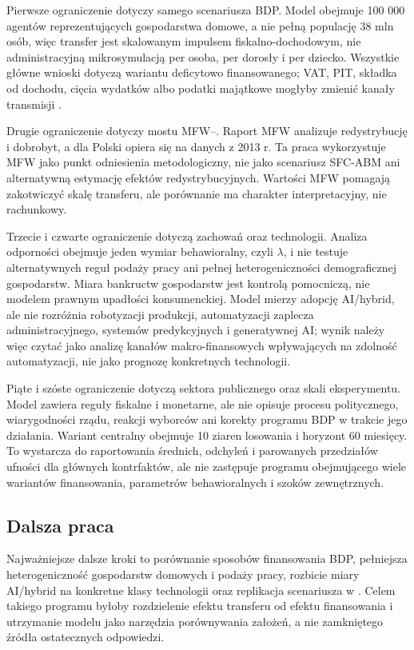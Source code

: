 Pierwsze ograniczenie dotyczy samego scenariusza BDP. Model obejmuje 100 000 agentów reprezentujących gospodarstwa domowe, a nie pełną populację 38 mln osób, więc transfer jest skalowanym impulsem fiskalno-dochodowym, nie administracyjną mikrosymulacją per osoba, per dorosły i per dziecko. Wszystkie główne wnioski dotyczą wariantu deficytowo finansowanego; VAT, PIT, składka od dochodu, cięcia wydatków albo podatki majątkowe mogłyby zmienić kanały transmisji \parencite{owsiak2017}.

Drugie ograniczenie dotyczy mostu MFW--\amor{}. Raport MFW analizuje redystrybucję i dobrobyt, a dla Polski opiera się na danych z 2013 r. Ta praca wykorzystuje MFW jako punkt odniesienia metodologiczny, nie jako scenariusz SFC-ABM ani alternatywną estymację efektów redystrybucyjnych. Wartości MFW pomagają zakotwiczyć skalę transferu, ale porównanie ma charakter interpretacyjny, nie rachunkowy.

Trzecie i czwarte ograniczenie dotyczą zachowań oraz technologii. Analiza odporności obejmuje jeden wymiar behawioralny, czyli \(\lambda\), i nie testuje alternatywnych reguł podaży pracy ani pełnej heterogeniczności demograficznej gospodarstw. Miara bankructw gospodarstw jest kontrolą pomocniczą, nie modelem prawnym upadłości konsumenckiej. Model mierzy adopcję AI/hybrid, ale nie rozróżnia robotyzacji produkcji, automatyzacji zaplecza administracyjnego, systemów predykcyjnych i generatywnej AI; wynik należy więc czytać jako analizę kanałów makro-finansowych wpływających na zdolność automatyzacji, nie jako prognozę konkretnych technologii.

Piąte i szóste ograniczenie dotyczą sektora publicznego oraz skali eksperymentu. Model zawiera reguły fiskalne i monetarne, ale nie opisuje procesu politycznego, wiarygodności rządu, reakcji wyborców ani korekty programu BDP w trakcie jego działania. Wariant centralny obejmuje 10 ziaren losowania i horyzont 60 miesięcy. To wystarcza do raportowania średnich, odchyleń i parowanych przedziałów ufności dla głównych kontrfaktów, ale nie zastępuje programu obejmującego wiele wariantów finansowania, parametrów behawioralnych i szoków zewnętrznych.

\subsection{Dalsza praca}

Najważniejsze dalsze kroki to porównanie sposobów finansowania BDP, pełniejsza heterogeniczność gospodarstw domowych i podaży pracy, rozbicie miary AI/hybrid na konkretne klasy technologii oraz replikacja scenariusza w \amor{}. Celem takiego programu byłoby rozdzielenie efektu transferu od efektu finansowania i utrzymanie modelu jako narzędzia porównywania założeń, a nie zamkniętego źródła ostatecznych odpowiedzi.
